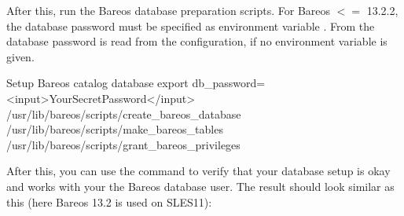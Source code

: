 After this, run the Bareos database preparation scripts.
For Bareos $<=$ 13.2.2, the database password must be specified as environment variable .
From 
the database password is read from the configuration, if no environment variable is given.

\begin{commands}{Setup Bareos catalog database}
export db_password=<input>YourSecretPassword</input>
/usr/lib/bareos/scripts/create_bareos_database
/usr/lib/bareos/scripts/make_bareos_tables
/usr/lib/bareos/scripts/grant_bareos_privileges
\end{commands}

After this, you can use the  command to verify that your database setup is okay
and works with your the Bareos database user.
The result should look similar as this (here Bareos 13.2 is used on SLES11):

